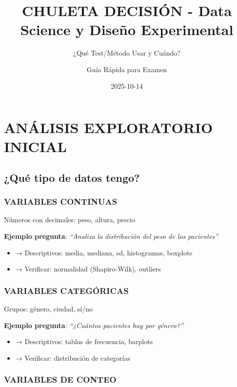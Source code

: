 \documentclass[
  10pt,
]{article}
\title{CHULETA DECISIÓN - Data Science y Diseño Experimental}
\subtitle{¿Qué Test/Método Usar y Cuándo?}
\author{Guía Rápida para Examen}
\date{2025-10-14}
\providecommand{\tightlist}{%
  \setlength{\itemsep}{0pt}\setlength{\parskip}{0pt}}
\begin{document}
\maketitle

{
\setcounter{tocdepth}{3}
\tableofcontents
}
\newpage

\section{ANÁLISIS EXPLORATORIO
INICIAL}\label{anuxe1lisis-exploratorio-inicial}

\subsection{¿Qué tipo de datos tengo?}\label{quuxe9-tipo-de-datos-tengo}

\subsubsection{VARIABLES CONTINUAS}\label{variables-continuas}

Números con decimales: peso, altura, precio

\textbf{Ejemplo pregunta}: \emph{``Analiza la distribución del peso de
los pacientes''}

\begin{itemize}
\tightlist
\item
  → Descriptivos: media, mediana, sd, histogramas, boxplots
\item
  → Verificar: normalidad (Shapiro-Wilk), outliers
\end{itemize}

\subsubsection{VARIABLES CATEGÓRICAS}\label{variables-categuxf3ricas}

Grupos: género, ciudad, sí/no

\textbf{Ejemplo pregunta}: \emph{``¿Cuántos pacientes hay por género?''}

\begin{itemize}
\tightlist
\item
  → Descriptivos: tablas de frecuencia, barplots
\item
  → Verificar: distribución de categorías
\end{itemize}

\subsubsection{VARIABLES DE CONTEO}\label{variables-de-conteo}
\end{document}
